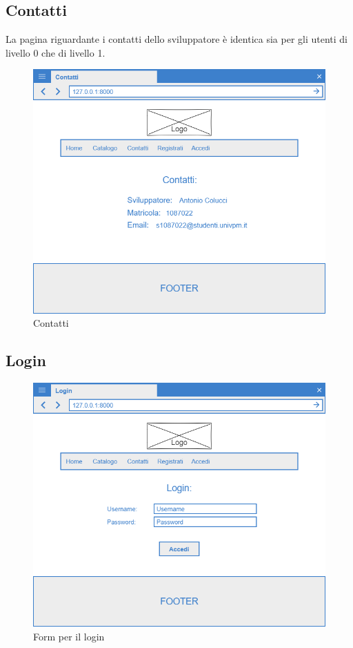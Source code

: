 \documentclass[12pt,a4paperS]{report}
\begin{document}
\begin{normalsize}
			\subsection{Contatti}
				La pagina riguardante i contatti dello sviluppatore è identica sia per gli utenti di livello 0 che di livello 1.
				\begin{figure}[H]
					\centering
					\includegraphics[width=1\textwidth, height=1\textheight, keepaspectratio]{Mockup/Contatti.png}
					\caption{Contatti}
				\end{figure}
				
			
			\subsection{Login}
				\begin{figure}[H]
					\centering
					\includegraphics[width=1\textwidth, height=1\textheight, keepaspectratio]{Mockup/Login.png}
					\caption{Form per il login}
				\end{figure}
			

\end{normalsize}
\end{document}

